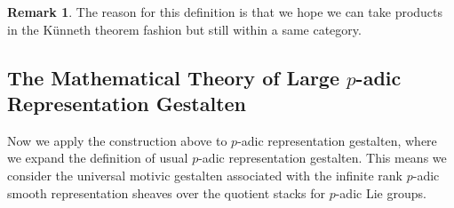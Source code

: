 \documentclass[12pt]{article}
\theoremstyle{definition}
\newtheorem{remark}{Remark}
\begin{document}
\begin{remark}
The reason for this definition is that we hope we can take products in the K\"unneth theorem fashion but still within a same category.
\end{remark}


\subsection{The Mathematical Theory of Large $p$-adic Representation Gestalten}

\noindent Now we apply the construction above to $p$-adic representation gestalten, where we expand the definition of usual $p$-adic representation gestalten. This means we consider the universal motivic gestalten associated with the infinite rank $p$-adic smooth representation sheaves over the quotient stacks for $p$-adic Lie groups.
\end{document}
